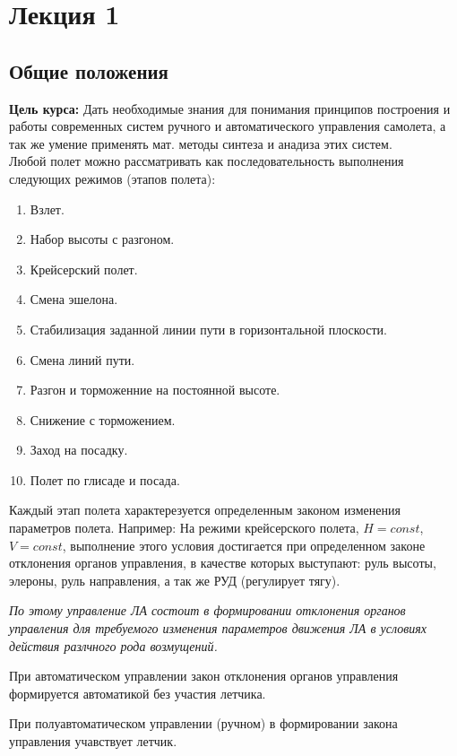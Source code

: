 \documentclass{article}
\begin{document}
\thispagestyle{empty}
\tableofcontents
\newpage

\section{Лекция 1}
\subsection{Общие положения}
\textbf{Цель курса:}
Дать необходимые знания для понимания принципов построения и работы современных систем ручного и автоматического управления самолета, а так же умение применять мат. методы синтеза и анадиза этих систем.\\
Любой полет можно рассматривать как последовательность выполнения следующих режимов (этапов полета):
\begin{enumerate}
  \item Взлет.
  \item Набор высоты с разгоном.
  \item Крейсерский полет.
  \item Смена эшелона.
  \item Стабилизация заданной линии пути в горизонтальной плоскости.
  \item Смена линий пути.
  \item Разгон и торможенние на постоянной высоте.
  \item Снижение с торможением.
  \item Заход на посадку.
  \item Полет по глисаде и посада.
\end{enumerate}

Каждый этап полета характерезуется определенным законом изменения параметров полета. Например: На режими крейсерского полета, $H=const$, $V=const$, выполнение этого условия достигается при определенном законе отклонения органов управления, в качестве которых выступают: руль высоты, элероны, руль направления, а так же РУД (регулирует тягу).
\begin{flushright} 
\textit{
По этому управление ЛА состоит в формировании отклонения органов управления для требуемого изменения параметров движения ЛА в условиях действия разлчного рода возмущений.}
\end{flushright}
При автоматическом управлении закон отклонения органов управления формируется автоматикой без участия летчика.

При полуавтоматическом управлении (ручном) в формировании закона управления учавствует летчик.
\end{document}
